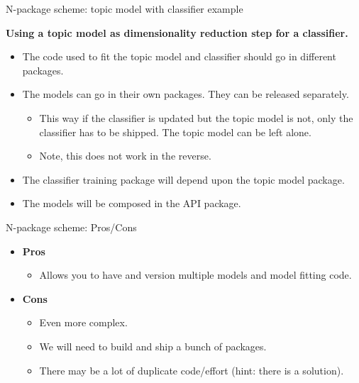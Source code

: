 \documentclass[10pt]{beamer}
\begin{document}
\begin{frame}[fragile]{N-package scheme: topic model with classifier example}

  \textbf{Using a topic model as dimensionality reduction step for a classifier.}
  \begin{itemize}
    \item The code used to fit the topic model and classifier should go in different packages.
    \item The models can go in their own packages. They can be released separately.
      \begin{itemize}
        \item This way if the classifier is updated but the topic model is not, only the classifier has to be shipped. The topic model can be left alone.
        \item Note, this does not work in the reverse.
      \end{itemize}
    \item The classifier training package will depend upon the topic model package.
    \item The models will be composed in the API package.
  \end{itemize}

\end{frame}

\begin{frame}[fragile]{N-package scheme: Pros/Cons}

  \begin{itemize}
    \item \textbf{Pros}
      \begin{itemize}
        \item Allows you to have and version multiple models and model fitting code.
      \end{itemize}

    \item \textbf{Cons}
      \begin{itemize}
        \item Even more complex.
        \item We will need to build and ship a bunch of packages.
        \item There may be a lot of duplicate code/effort (hint: there is a solution).
      \end{itemize}
  \end{itemize}

\end{frame}
\end{document}
